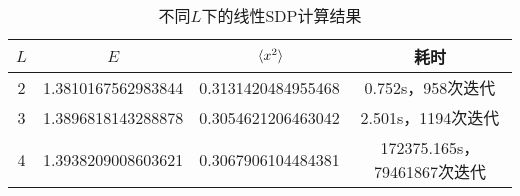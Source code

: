 
\begin{table}
    \caption{不同$L$下的线性SDP计算结果}
    \label{tbl:linear-sdp-oscillator-result}
    \centering
    \begin{tabular}{cccc}
        \toprule
          $L$ & $E$ & $\expval*{x^2}$ & 耗时 \\
        \midrule
          2 & 1.3810167562983844  & 0.3131420484955468 & 0.752s，958次迭代  \\
          3 & 1.3896818143288878  & 0.3054621206463042 & 2.501s，1194次迭代 \\
          4 & 1.3938209008603621  & 0.3067906104484381 & 172375.165s，79461867次迭代  \\
        \bottomrule
    \end{tabular}
\end{table}